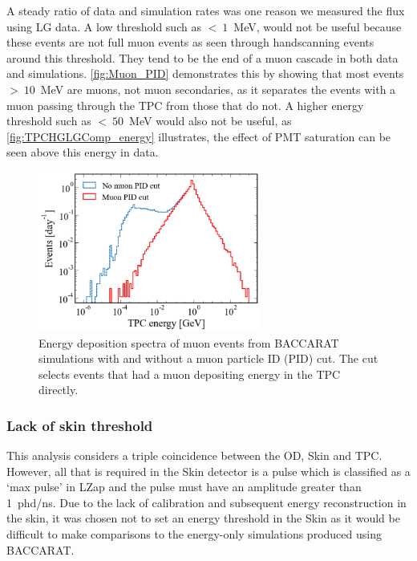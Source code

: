 A steady ratio of data and simulation rates was one reason we measured the flux using LG data. A low threshold such as $<~1$~MeV, would not be useful because these events are not full muon events as seen through handscanning events around this threshold. They tend to be the end of a muon cascade in both data and simulations. \autoref{fig:Muon_PID} demonstrates this by showing that most events $>~10$~MeV are muons, not muon secondaries, as it separates the events with a muon passing through the TPC from those that do not. A higher energy threshold such as $<~50$~MeV would also not be useful, as \autoref{fig:TPCHGLGComp_energy} illustrates, the effect of PMT saturation can be seen above this energy in data.
\begin{figure}[htbp]
    \centering
    \includegraphics[width=0.65\textwidth]{figures/Muons/Muon_pid_cutLZstyle.pdf}
    \caption{Energy deposition spectra of muon events from BACCARAT simulations with and without a muon particle ID (PID) cut. The cut selects events that had a muon depositing energy in the TPC directly.}
    \label{fig:Muon_PID}
\end{figure}

\subsubsection{Lack of skin threshold}
This analysis considers a triple coincidence between the OD, Skin and TPC. However, all that is required in the Skin detector is a pulse which is classified as a `max pulse' in LZap and the pulse must have an amplitude greater than 1~phd/ns. Due to the lack of calibration and subsequent energy reconstruction in the skin, it was chosen not to set an energy threshold in the Skin as it would be difficult to make comparisons to the energy-only simulations produced using BACCARAT.


